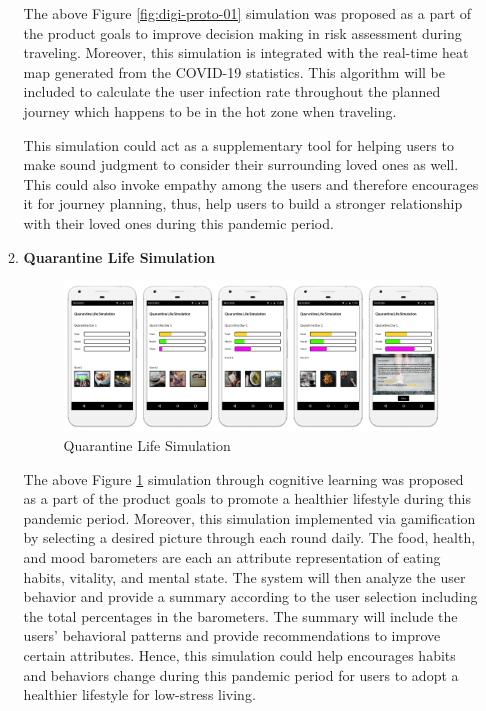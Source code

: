 \begin{enumerate}[a)]
\begin{enumerate}[label=(\roman*)]
\begin{figure}[H]
            \end{figure}
            \par The above Figure \ref{fig:digi-proto-01} simulation was proposed as a part of the product goals to improve decision making in risk assessment during traveling. Moreover, this simulation is integrated with the real-time heat map generated from the COVID-19 statistics. This algorithm will be included to calculate the user infection rate throughout the planned journey which happens to be in the hot zone when traveling.
            \par This simulation could act as a supplementary tool for helping users to make sound judgment to consider their surrounding loved ones as well. This could also invoke empathy among the users and therefore encourages it for journey planning, thus, help users to build a stronger relationship with their loved ones during this pandemic period.
          \item \textbf{Quarantine Life Simulation}
            \begin{figure}[H]
              \centering
              \includegraphics[scale=1]{img/digital-prototype/quarantine-life.png}
              \caption{Quarantine Life Simulation}
              \label{fig:digi-proto-02}
            \end{figure}
            \par The above Figure \ref{fig:digi-proto-02} simulation through cognitive learning was proposed as a part of the product goals to promote a healthier lifestyle during this pandemic period. Moreover, this simulation implemented via gamification by selecting a desired picture through each round daily. The food, health, and mood barometers are each an attribute representation of eating habits, vitality, and mental state. The system will then analyze the user behavior and provide a summary according to the user selection including the total percentages in the barometers. The summary will include the users' behavioral patterns and provide recommendations to improve certain attributes. Hence, this simulation could help encourages habits and behaviors change during this pandemic period for users to adopt a healthier lifestyle for low-stress living.

\end{enumerate}
\end{enumerate}
